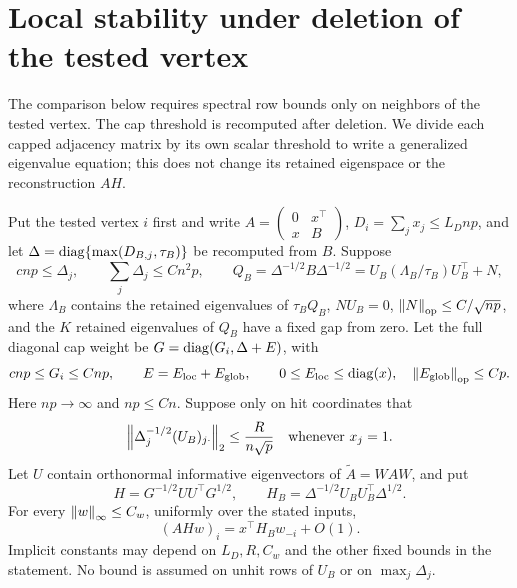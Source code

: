 \section{Local stability under deletion of the tested vertex}
\label{restore:loo}

The comparison below requires spectral row bounds only on neighbors
of the tested vertex. The cap threshold is recomputed after deletion.
We divide each capped adjacency matrix by its own scalar threshold
to write a generalized eigenvalue equation; this does not change its
retained eigenspace or the reconstruction $AH$.

\begin{lemma}\label{restore:loo-scalar}
Put the tested vertex $i$ first and write $A=\left(\begin{smallmatrix}0&x^\top\\x&B\end{smallmatrix}\right)$,
$D_i=\sum_jx_j\le L_D{np}$, and let
$\Delta=\operatorname{diag}\{\max(D_{B,j},\tau_B)\}$ be recomputed from $B$.
Suppose
\[
 c{np}\le\Delta_j,\qquad \sum_j\Delta_j\le C{n^2p},
 \qquad Q_B=\Delta^{-1/2}B\Delta^{-1/2}
   =U_B(\Lambda_B/\tau_B)U_B^\top+N,
\]
where $\Lambda_B$ contains the retained eigenvalues of $\tau_BQ_B$,
$NU_B=0$, $\left\lVert N\right\rVert_{\mathrm{op}}\le C/\sqrt {np}$, and the $K$ retained
eigenvalues of $Q_B$ have a fixed gap from zero. Let the full diagonal cap weight be
$G=\operatorname{diag}(G_i,\Delta+E)$, with
\[
 c{np}\le G_i\le C{np},\qquad E=E_\mathrm{loc}+E_\mathrm{glob},\qquad
 0\le E_\mathrm{loc}\le\operatorname{diag}(x),\quad
 \left\lVert E_\mathrm{glob}\right\rVert_{\mathrm{op}}\le Cp.
\]
Here ${np}\to\infty$ and ${np}\le Cn$. Suppose only on hit coordinates that
\begin{equation}\label{restore:loo-hit}
 \left\lVert\Delta_j^{-1/2}(U_B)_{j\cdot}\right\rVert_2
       \le \frac{R}{n\sqrt p}\quad\text{whenever }x_j=1.
\end{equation}
Let $U$ contain orthonormal informative eigenvectors of $\widetilde A=WAW$, and put
\[
 H=G^{-1/2}UU^\top G^{1/2},\qquad
 H_B=\Delta^{-1/2}U_BU_B^\top\Delta^{1/2}.
\]
For every $\left\lVert w\right\rVert_\infty\le C_w$, uniformly over the stated inputs,
\begin{equation}\label{restore:loo-main}
 (AHw)_i=x^\top H_Bw_{-i}+O(1).
\end{equation}
Implicit constants may depend on $L_D,R,C_w$ and the other fixed bounds
in the statement. No bound is assumed on unhit rows of $U_B$ or on $\max_j\Delta_j$.
\end{lemma}

